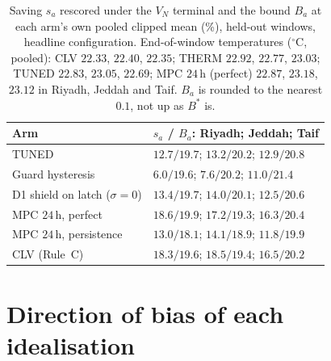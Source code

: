 \documentclass[11pt]{article}
\begin{document}
\begin{table}[!ht]
\centering
\caption{Saving $s_a$ rescored under the $V_N$ terminal and the bound $B_a$ at
each arm's own pooled clipped mean (\%), held-out windows, headline
configuration. End-of-window temperatures ($^\circ$C, pooled): CLV $22.33$,
$22.40$, $22.35$; THERM $22.92$, $22.77$, $23.03$; TUNED $22.83$, $23.05$,
$22.69$; MPC $24\,$h (perfect) $22.87$, $23.18$, $23.12$ in Riyadh, Jeddah and
Taif. $B_a$ is rounded to the nearest $0.1$, not up as $B^\ast$ is.}
\label{tab:s-ba}
\small
\begin{tabularx}{\textwidth}{@{}lX@{}}
\toprule
Arm & $s_a$ / $B_a$: Riyadh; Jeddah; Taif \\
\midrule
TUNED & $12.7/19.7$; $13.2/20.2$; $12.9/20.8$ \\
Guard hysteresis & $6.0/19.6$; $7.6/20.2$; $11.0/21.4$ \\
D1 shield on latch ($\sigma=0$) & $13.4/19.7$; $14.0/20.1$; $12.5/20.6$ \\
MPC $24\,$h, perfect & $18.6/19.9$; $17.2/19.3$; $16.3/20.4$ \\
MPC $24\,$h, persistence & $13.0/18.1$; $14.1/18.9$; $11.8/19.9$ \\
CLV (Rule~C) & $18.3/19.6$; $18.5/19.4$; $16.5/20.2$ \\
\bottomrule
\end{tabularx}
\end{table}

\section{Direction of bias of each idealisation}
\label{sec:s-bias}
\end{document}
